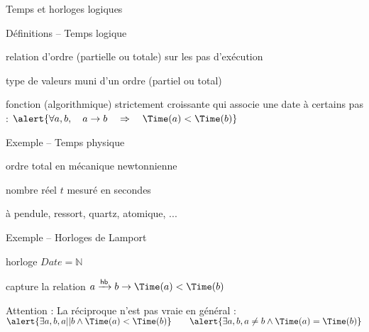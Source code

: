 
\begingroup


\begin{frame}{Temps et horloges logiques}
 
  \begin{block}{Définitions -- Temps logique}
    \begin{description}[Horloge :]
    \item[Temps :] relation d'ordre \structure{$\rightarrow$} (partielle ou totale) sur les pas d'exécution
    \item[Date :] type de valeurs muni d'un ordre (partiel ou total) \structure{$\le$}
    \item[Horloge :] fonction (algorithmique) \alert{strictement croissante} \structure{$\Time$}
      qui associe une date à certains pas : 
      $\alert{\forall a, b, \quad a \rightarrow b \quad \Rightarrow \quad \Time(a) < \Time(b)}$
    \end{description}
  \end{block}

  \begin{exampleblock}{Exemple -- Temps physique}
    \vspace{-2mm}
    \begin{description}[Temps :]
    \item[Temps :] ordre total en mécanique newtonnienne
    \item[Date :] nombre réel $t$ mesuré en secondes
    \item[Horloge :] à pendule, ressort, quartz, atomique, ...
    \end{description}
  \end{exampleblock}

  \pause
  
  \begin{alertblock}{Exemple -- Horloges de Lamport}
    \vspace{-2mm}
    \begin{description}[Horloge :]
    \item[Date :] horloge  \hfill \alert{$\mathit{Date} = \mathbb{N}$}
    \item[Temps :] \vspace{-1mm} capture la relation  \hfill \alert{$a \hb b  \rightarrow \Time(a) < \Time(b)$}
    \end{description}
    \alert{Attention :} La réciproque n'est pas vraie en général :
    \centering
    $\alert{\exists a, b, a || b \land \Time(a) < \Time(b)} \quad \quad \alert{\exists a, b, a \neq b \land \Time(a) = \Time(b)}$
  \end{alertblock}
  
\end{frame}

\endgroup
\endinput

